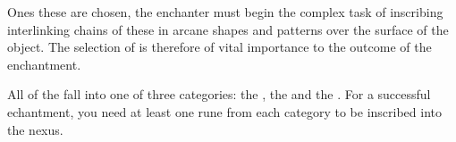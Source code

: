 Ones these  are chosen, the enchanter must begin the complex task of inscribing interlinking chains of these  in arcane shapes and patterns over the surface of the object.  The selection of  is therefore of vital importance to the outcome of the enchantment. 


All of the  fall into one of three categories: the , the  and the . For a successful echantment, you need at least one rune from each category to be inscribed into the nexus. 


\newcommand\runeRow[3]
{
	\rune{#2}	&	#1	&		\small #3 \\
}
\newcommand\esoRow[3]
{
	\runeRow{#1}{#2}{Used to contain magic associated with the \key{#3} discipline.}
}

\newcommand\runeList[3]
{
	\subsection{#1}

	#2

	\begin{center}
		\begin{rndtable}{c l p {6 cm} }
			\bf Rune	&	\bf Name	&	\bf Description
			\\
			
			#3
		\end{rndtable}
	\end{center}
}






